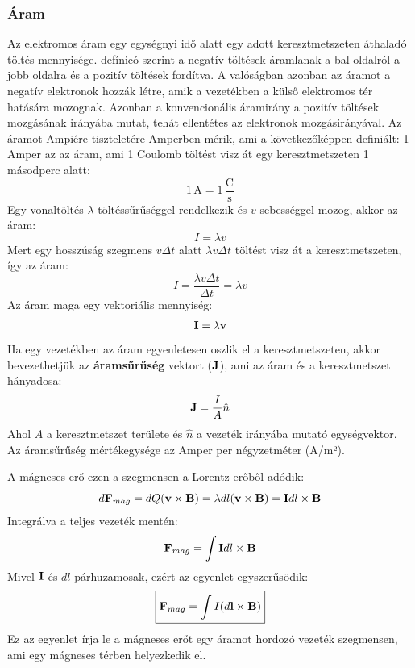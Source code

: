 \documentclass[a4paper,12pt]{article}
\begin{document}
\subsubsection{Áram}
Az elektromos áram egy egységnyi idő alatt egy adott keresztmetszeten áthaladó töltés mennyisége. defínicó szerint a negatív töltések áramlanak a bal oldalról a jobb oldalra és a pozitív töltések fordítva.
A valóságban azonban az áramot a negatív elektronok hozzák létre, amik a vezetékben a külső elektromos tér hatására mozognak. Azonban a konvencionális áramirány a pozitív töltések mozgásának irányába mutat,
tehát ellentétes az elektronok mozgásirányával. Az áramot Ampiére tiszteletére Amperben mérik, ami a következőképpen definiált: 1 Amper az az áram, ami 1 Coulomb töltést visz át egy keresztmetszeten 1 másodperc alatt:
\begin{equation}
    1 \, \text{A} = 1 \, \frac{\text{C}}{\text{s}}
\end{equation}
Egy vonaltöltés $\lambda$ töltéssűrűséggel rendelkezik és $v$ sebességgel mozog, akkor az áram:
\begin{equation}
    I = \lambda v
\end{equation}
Mert egy hosszúság szegmens $v\Delta t$ alatt $\lambda v \Delta t$ töltést visz át a keresztmetszeten, így az áram:
\begin{equation}
    I = \frac{\lambda v \Delta t}{\Delta t} = \lambda v
\end{equation}
Az áram maga egy vektoriális mennyiség:
\begin{equation}
    \bold{I} = \lambda \bold{v}
\end{equation}
Ha egy vezetékben az áram egyenletesen oszlik el a keresztmetszeten, akkor bevezethetjük az \textbf{áramsűrűség} vektort ($\bold{J}$), ami az áram és a keresztmetszet hányadosa:
\begin{equation}
    \bold{J} = \frac{I}{A} \hat{n}
\end{equation}
Ahol $A$ a keresztmetszet területe és $\hat{n}$ a vezeték irányába mutató egységvektor. Az áramsűrűség mértékegysége az Amper per négyzetméter (A/m²).

A mágneses erő ezen a szegmensen a Lorentz-erőből adódik:
\begin{equation}
    d\bold{F}_{mag} = dQ (\bold{v} \times \bold{B}) = \lambda dl (\bold{v} \times \bold{B}) = \bold{I} dl \times \bold{B}
\end{equation}
Integrálva a teljes vezeték mentén:
\begin{equation}
    \bold{F}_{mag} = \int \bold{I} dl \times \bold{B}
\end{equation}
Mivel $\bold{I}$ és $dl$ párhuzamosak, ezért az egyenlet egyszerűsödik:
\begin{equation}
   \boxed{\bold{F}_{mag} = \int I (d\bold{l} \times \bold{B})}
\end{equation}
Ez az egyenlet írja le a mágneses erőt egy áramot hordozó vezeték szegmensen, ami egy mágneses térben helyezkedik el.
\end{document}
